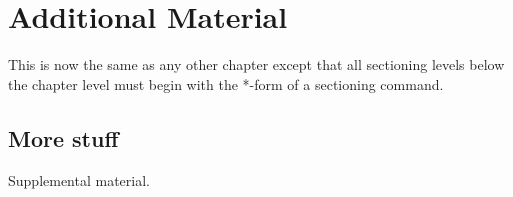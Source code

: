 \appendixtitle
\appendix
\chapter{Additional Material}

This is now the same as any other chapter except that
all sectioning levels below the chapter level must begin
with the *-form of a sectioning command.

\section*{More stuff}

Supplemental material.


